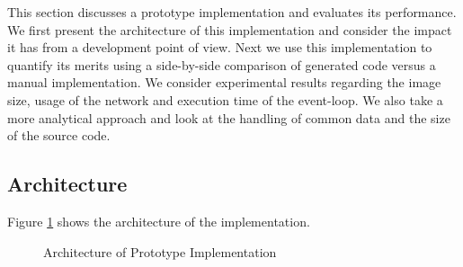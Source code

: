 \documentclass[conference]{IEEEtran}
\begin{document}
This section discusses a prototype implementation and evaluates its
performance. We first present the architecture of this implementation and
consider the impact it has from a development point of view. Next we use this
implementation to quantify its merits using a side-by-side comparison of
generated code versus a manual implementation. We consider experimental results
regarding the image size, usage of the network and execution time of the
event-loop. We also take a more analytical approach and look at the handling of
common data and the size of the source code.

\subsection{Architecture}

Figure \ref{fig:architecture} shows the architecture of the implementation.

\begin{figure}[ht]
  \centering
  \caption{Architecture of Prototype Implementation}
  \label{fig:architecture}
\end{figure}
\end{document}
